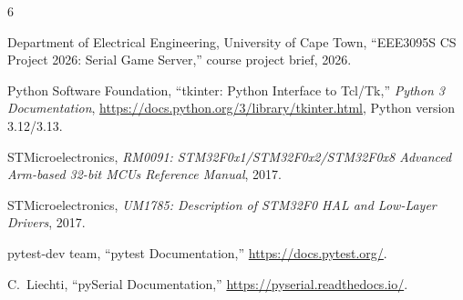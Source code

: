 \documentclass[conference]{IEEEtran}
\begin{document}
\begin{thebibliography}{6}

Department of Electrical Engineering, University of Cape Town, ``{EEE3095S} {CS} Project 2026: Serial Game Server,'' course project brief, 2026.

Python Software Foundation, ``tkinter: Python Interface to {Tcl/Tk},'' \emph{Python 3 Documentation}, \url{https://docs.python.org/3/library/tkinter.html}, Python version 3.12/3.13.

STMicroelectronics, \emph{RM0091: STM32F0x1/STM32F0x2/STM32F0x8 Advanced Arm-based 32-bit MCUs Reference Manual}, 2017.

STMicroelectronics, \emph{UM1785: Description of STM32F0 HAL and Low-Layer Drivers}, 2017.

pytest-dev team, ``pytest Documentation,'' \url{https://docs.pytest.org/}.

C.~Liechti, ``pySerial Documentation,'' \url{https://pyserial.readthedocs.io/}.

\end{thebibliography}
\end{document}
